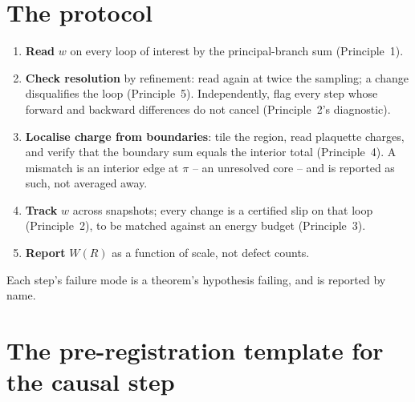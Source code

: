 \documentclass[11pt,a4paper]{article}
\begin{document}
\section{The protocol}

\begin{enumerate}[leftmargin=*]
\item \textbf{Read} $w$ on every loop of interest by the principal-branch sum (Principle~1).
\item \textbf{Check resolution} by refinement: read again at twice the sampling; a change disqualifies
  the loop (Principle~5). Independently, flag every step whose forward and backward differences do
  not cancel (Principle~2's diagnostic).
\item \textbf{Localise charge from boundaries}: tile the region, read plaquette charges, and verify
  that the boundary sum equals the interior total (Principle~4). A mismatch is an interior edge at
  $\pi$ -- an unresolved core -- and is reported as such, not averaged away.
\item \textbf{Track} $w$ across snapshots; every change is a certified slip on that loop
  (Principle~2), to be matched against an energy budget (Principle~3).
\item \textbf{Report} $W(R)$ as a function of scale, not defect counts.
\end{enumerate}
Each step's failure mode is a theorem's hypothesis failing, and is reported by name.

\section{The pre-registration template for the causal step}\label{sec:prereg}
\end{document}
